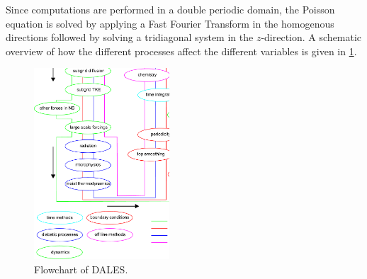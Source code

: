 Since computations are performed in a double periodic domain, the Poisson equation is solved by applying a Fast Fourier Transform in the homogenous directions followed by solving a tridiagonal system in the $z$-direction. A schematic overview of how the different processes affect the different variables is given in \fignm \ref{fig:flowchart}.
\begin{figure}
 \begin{center}
\includegraphics[width=0.45\textwidth]{fig_flowchart}
\caption{Flowchart of DALES.}
\label{fig:flowchart}
\end{center}
\end{figure}

